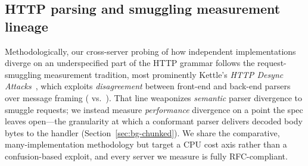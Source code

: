 \subsection{HTTP parsing and smuggling measurement lineage}
\label{sec:rel-smuggling}

Methodologically, our cross-server probing of how independent
implementations diverge on an underspecified part of the HTTP grammar
follows the request-smuggling measurement tradition, most prominently
Kettle's \emph{HTTP Desync Attacks}~\cite{kettle_desync}, which exploits
\emph{disagreement} between front-end and back-end parsers over message
framing ( vs.\ ). That line
weaponizes \emph{semantic} parser divergence to smuggle requests; we
instead measure \emph{performance} divergence on a point the spec leaves
open---the granularity at which a conformant parser delivers decoded body
bytes to the handler (Section~\ref{sec:bg-chunked}). We share the
comparative, many-implementation methodology but target a CPU cost axis
rather than a confusion-based exploit, and every server we measure is
fully RFC-compliant.
